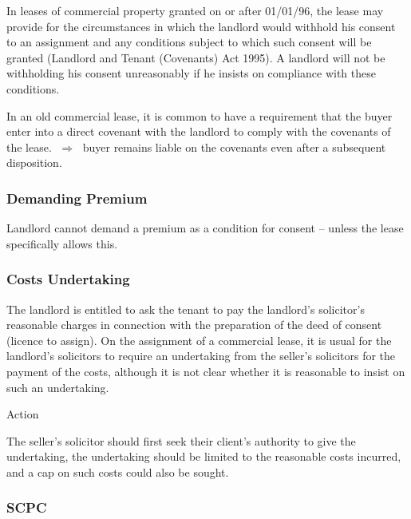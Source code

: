 \documentclass[
]{article}
\newenvironment{env-da05fb3b-c564-4905-b729-fa3c9eadbf7c}
{
    \savenotes\tcolorbox[blanker,breakable,left=5pt,borderline west={2pt}{-4pt}{aquamarine}]
}
{
    \endtcolorbox\spewnotes
}
\begin{document}
In leases of commercial property granted on or after 01/01/96, the lease
may provide for the circumstances in which the landlord would withhold
his consent to an assignment and any conditions subject to which such
consent will be granted (Landlord and Tenant (Covenants) Act 1995). A
landlord will not be withholding his consent unreasonably if he insists
on compliance with these conditions.

In an old commercial lease, it is common to have a requirement that the
buyer enter into a direct covenant with the landlord to comply with the
covenants of the lease. {\(\;\Longrightarrow\;\)} buyer remains liable
on the covenants even after a subsequent disposition.

\hypertarget{demanding-premium}{%
\subsubsection{Demanding Premium}\label{demanding-premium}}

Landlord cannot demand a premium as a condition for consent -- unless
the lease specifically allows this.

\hypertarget{costs-undertaking}{%
\subsubsection{Costs Undertaking}\label{costs-undertaking}}

The landlord is entitled to ask the tenant to pay the landlord's
solicitor's reasonable charges in connection with the preparation of the
deed of consent (licence to assign). On the assignment of a commercial
lease, it is usual for the landlord's solicitors to require an
undertaking from the seller's solicitors for the payment of the costs,
although it is not clear whether it is reasonable to insist on such an
undertaking.

\begin{env-da05fb3b-c564-4905-b729-fa3c9eadbf7c}

Action

The seller's solicitor should first seek their client's authority to
give the undertaking, the undertaking should be limited to the
reasonable costs incurred, and a cap on such costs could also be sought.

\end{env-da05fb3b-c564-4905-b729-fa3c9eadbf7c}

\hypertarget{scpc}{%
\subsubsection{SCPC}\label{scpc}}
\end{document}
